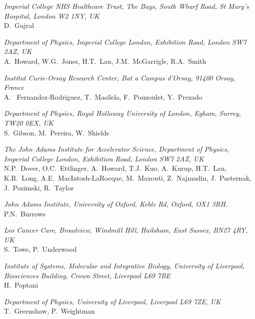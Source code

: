 \vspace{0.5cm}
\noindent \textit{Imperial College NHS Healthcare Trust, The Bays, South Wharf Road, St Mary's Hospital, London W2 1NY, UK} \\
D.~Gujral
 
\vspace{0.5cm}
\noindent \textit{Department of Physics, Imperial College London, Exhibition Road, London SW7 2AZ, UK} \\
A.~Howard, W.G.~Jones, H.T.~Lau, J.M.~McGarrigle, R.A.~Smith
 
\vspace{0.5cm}
\noindent \textit{Institut Curie-Orsay Research Center, Bat a Campus d'Orsay, 91400 Orsay, France} \\
A. ~Fernandez-Rodriguez, T.~Masilela, F.~Pouzoulet, Y.~Prezado
 
\vspace{0.5cm}
\noindent \textit{Department of Physics, Royal Holloway University of London, Egham, Surrey, TW20 0EX, UK} \\
S.~Gibson, M.~Pereira, W.~Shields
 
\vspace{0.5cm}
\noindent \textit{The John Adams Institute for Accelerator Science, Department of Physics, Imperial College London, Exhibition Road, London SW7 2AZ, UK} \\
N.P.~Dover, O.C.~Ettlinger, A.~Howard, T.J.~Kuo, A.~Kurup, H.T.~Lau, K.R.~Long, A.E.~MacIntosh-LaRocque, M.~Maxouti, Z.~Najmudin, J.~Pasternak, J.~Pozimski, R.~Taylor
 
\vspace{0.5cm}
\noindent \textit{John Adams Institute, University of Oxford, Keble Rd, Oxford, OX1 3RH.} \\
P.N.~Burrows
 
\vspace{0.5cm}
\noindent \textit{Leo Cancer Care, Broadview, Windmill Hill, Hailsham, East Sussex, BN27 4RY, UK} \\
S.~Towe, P.~Underwood
 
\vspace{0.5cm}
\noindent \textit{Institute of Systems, Molecular and Integrative Biology, University of Liverpool, Biosciences Building, Crown Street, Liverpool L69 7BE} \\
H.~Poptani
 
\vspace{0.5cm}
\noindent \textit{Department of Physics, University of Liverpool, Liverpool L69 7ZE, UK} \\
T.~Greenshaw, P.~Weightman
 
